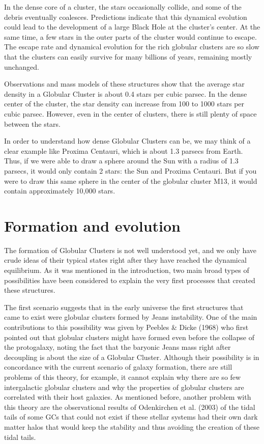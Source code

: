 In the dense core of a cluster, the stars occasionally collide, and some of the debris eventually coalesces. Predictions indicate that this dynamical evolution could lead to the development of a large Black Hole at the cluster's center. At the same time, a few stars in the outer parts of the cluster would continue to escape. The escape rate and dynamical evolution for the rich globular clusters are so slow that the clusters can easily survive for many billions of years, remaining mostly unchanged.

Observations and mass models of these structures show that the average star density in a Globular Cluster is about 0.4 stars per cubic parsec. In the dense center of the cluster, the star density can increase from 100 to 1000 stars per cubic parsec. However, even in the center of clusters, there is still plenty of space between the stars.

In order to understand how dense Globular Clusters can be, we may think of a clear example like Proxima Centauri, which is about 1.3 parsecs from Earth. Thus, if we were able to draw a sphere around the Sun with a radius of 1.3 parsecs, it would only contain 2 stars: the Sun and Proxima Centauri. But if you were to draw this same sphere in the center of the globular cluster M13, it would contain approximately 10,000 stars.

\section{Formation and evolution}

The formation of Globular Clusters is not well understood yet, and we only have crude ideas of their typical states right after they have reached the dynamical equilibrium. As it was mentioned in the introduction, two main broad types of possibilities have been considered to explain the very first processes that created these structures. 

The first scenario suggests that in the early universe the first structures that came to exist were globular clusters formed by Jeans instability. One of the main contributions to this possibility was given by Peebles \& Dicke (1968) \cite{7} who first pointed out that globular clusters might have formed even before the collapse of the protogalaxy, noting the fact that the baryonic Jeans mass right after decoupling is about the size of a Globular Cluster. Although their possibility is in concordance with the current scenario of galaxy formation, there are still problems of this theory, for example, it cannot explain why there are so few intergalactic globular clusters and why the properties of globular clusters are correlated with their host galaxies. As mentioned before, another problem with this theory are the observational results of Odenkirchen et al. (2003) \cite{12} of the tidal tails of some GCs that could not exist if these stellar systems had their own dark matter halos that would keep the stability and thus avoiding the creation of these tidal tails.

